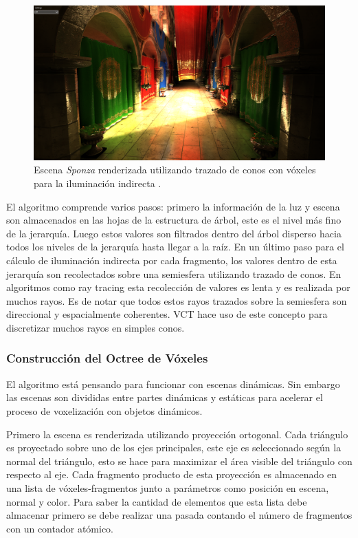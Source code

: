 \begin{figure}[H]
	\centering
	\includegraphics[width=0.9\linewidth]{media/givoxels_sponzanew1.png}
	\caption{Escena \emph{Sponza} renderizada utilizando trazado de conos con vóxeles para la iluminación indirecta \cite{CNSGE11b}.}
	\label{fig:givoxels_sponzanew1}
\end{figure}

El algoritmo comprende varios pasos: primero la información de la luz y escena son almacenados en las hojas de la estructura de árbol, este es el nivel más fino de la jerarquía. Luego estos valores son filtrados dentro del árbol disperso hacia todos los niveles de la jerarquía hasta llegar a la raíz. En un último paso para el cálculo de iluminación indirecta por cada fragmento, los valores dentro de esta jerarquía son recolectados sobre una semiesfera utilizando trazado de conos. En algoritmos como ray tracing esta recolección de valores es lenta y es realizada por muchos rayos. Es de notar que todos estos rayos trazados sobre la semiesfera son direccional y espacialmente coherentes. \Ac{VCT} hace uso de este concepto para discretizar muchos rayos en simples conos.

\subsubsection{Construcción del Octree de Vóxeles}
El algoritmo está pensando para funcionar con escenas dinámicas. Sin embargo las escenas son divididas entre partes dinámicas y estáticas para acelerar el proceso de voxelización con objetos dinámicos.

Primero la escena es renderizada utilizando proyección ortogonal. Cada triángulo es proyectado sobre uno de los ejes principales, este eje es seleccionado según la normal del triángulo, esto se hace para maximizar el área visible del triángulo con respecto al eje. Cada fragmento producto de esta proyección es almacenado en una lista de vóxeles-fragmentos junto a parámetros como posición en escena, normal y color. Para saber la cantidad de elementos que esta lista debe almacenar primero se debe realizar una pasada contando el número de fragmentos con un contador atómico.

